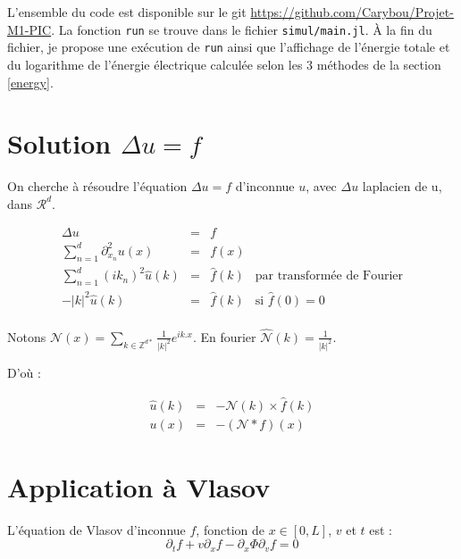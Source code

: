 \documentclass[a4paper,11pt]{article}
\newcommand{\Python}[1]{\texttt{#1}}
\begin{document}
L'ensemble du code est disponible sur le git \url{https://github.com/Carybou/Projet-M1-PIC}. La fonction \Python{run} se trouve dans le fichier \Python{simul/main.jl}. À la fin du fichier, je propose une exécution de \Python{run} ainsi que l'affichage de l'énergie totale et du logarithme de l'énergie électrique calculée selon les 3 méthodes de la section \ref{energy}.

\section{Solution $\Delta u = f$}
\label{delta u}

On cherche à résoudre l'équation $\Delta u = f$ d'inconnue $u$, avec $\Delta u$ laplacien de u, dans $\mathcal{R}^d$.

$$
\begin{array}{rclr}

\Delta u &=& f \\

\sum\limits_{n=1}^d {\partial^2_ {x_n}} u(x) &=& f(x) \\

\sum\limits_{n=1}^d (ik_n)^2 \widehat{u}(k) &=& \widehat{f}(k) & \text{par transformée de Fourier} \\

-|k|^2  \widehat{u}(k) &=& \widehat{f}(k) & \text{si } \widehat{f}(0)=0 \\

\end{array}
$$

Notons $\mathcal{N} (x) = \sum\limits _{k \in \mathbb{Z}^{d*}} \frac{1}{|k|^2} e^{ik.x}$. En fourier $\widehat{\mathcal{N}}(k) = \frac{1}{|k|^2}$.

D'où :

$$
\begin{array}{rclr}

\widehat{u} (k) &=& - \mathcal{N}(k) \times \widehat{f} (k) \\

u(x) &=& - (\mathcal{N} \ast f) (x)

\end{array}
$$

\section{Application à Vlasov}

L'équation de Vlasov d'inconnue $f$, fonction de $x \in [0, L]$, $v$ et $t$ est :
$$
\partial_t f + v \partial_x f - \partial_ x \Phi \partial_v f = 0
$$
\end{document}
